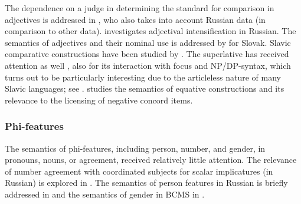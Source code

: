 \documentclass[output=paper,colorlinks,citecolor=brown]{langscibook}
\begin{document}
The dependence on a judge in determining the standard for comparison in adjectives is addressed in \citet{bylininadiss}, who also takes into account Russian data (in comparison to other data). \citet{goncharov15} investigates adjectival intensification in Russian. The semantics of adjectives and their nominal use is addressed by \citet{king18} for Slovak. Slavic comparative constructions have been studied by \citet{pancheva06,ionin-matushansky13}. The superlative has received attention as well \citep[see e.g.][]{stateva03}, also for its interaction with focus and NP/DP-syntax, which turns out to be particularly interesting due to the articleless nature of many Slavic languages; see \citet{zivanovic07,zivanovic08,boskovic-gajewski11,pancheva-tomaszewicz12,tomaszewicz15}. \citet{Docekal2025} studies the semantics of equative constructions and its relevance to the licensing of negative concord items.



\subsubsection{Phi-features} The semantics of phi-features, including person, number, and gender, in pronouns, nouns, or agreement, received relatively little attention. The relevance of number agreement with coordinated subjects for scalar implicatures (in Russian) is explored in \citet{ivlieva12a, ivlieva12b,ivlievadiss}. The semantics of person features in Russian is briefly addressed in \citet{podobryaev17} and the semantics of gender in BCMS in \citet{murphy-etal18}. %
\end{document}
